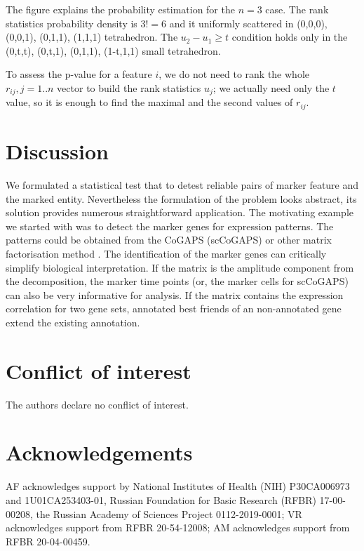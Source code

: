 \documentclass{llncs}
\begin{document}
The figure explains the probability estimation for the $n=3$ case. The rank statistics probability density is $3!=6$ and it uniformly scattered in (0,0,0), (0,0,1), (0,1,1), (1,1,1) tetrahedron. The $u_2 - u_1 \ge t$ condition holds only in the (0,t,t), (0,t,1), (0,1,1), (1-t,1,1) small tetrahedron.

To assess the p-value for a feature $i$, we do not need to rank the whole $r_{ij}, j=1..n$ vector to build the rank statistics $u_j$; we actually need only the $t$ value, so it is enough to find the maximal and the second values of $r_{ij}$.

\section{Discussion}

We formulated a statistical test that to detest reliable pairs of marker feature and the marked entity. Nevertheless the formulation of the problem looks abstract, its solution provides numerous straightforward application. The motivating example we started with was to detect the marker genes for expression patterns. The patterns could be obtained from the CoGAPS (scCoGAPS) \cite{Fertig_2016} or other matrix factorisation method \cite{Stein_2018}. The identification of the marker genes can critically simplify biological interpretation. If the matrix is the amplitude component from  the decomposition, the marker time points (or, the marker cells for scCoGAPS) can also be very informative for analysis. If the matrix contains the expression correlation for two gene sets, annotated best friends of an non-annotated gene extend the existing annotation.

\section{Conflict of interest}
The authors declare no conflict of interest.

\section{Acknowledgements}
AF acknowledges support by National Institutes of Health (NIH) P30CA006973 and 1U01CA253403-01, Russian Foundation for Basic Research (RFBR) 17-00-00208, the Russian Academy of Sciences Project 0112-2019-0001; VR acknowledges support from RFBR 20-54-12008; AM acknowledges support from RFBR 20-04-00459.


\end{document}
